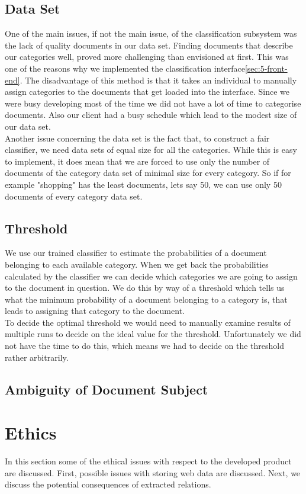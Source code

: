 \subsection{Data Set}
One of the main issues, if not the main issue, of the classification subsystem was the lack of quality documents in our data set. Finding documents that describe our categories well, proved more challenging than envisioned at first. This was one of the reasons why we implemented the classification interface\ref{sec:5-front-end}. The disadvantage of this method is that it takes an individual to manually assign categories to the documents that get loaded into the interface. Since we were busy developing most of the time we did not have a lot of time to categorise documents. Also our client had a busy schedule which lead to the modest size of our data set.\\
Another issue concerning the data set is the fact that, to construct a fair classifier, we need data sets of equal size for all the categories. While this is easy to implement, it does mean that we are forced to use only the number of documents of the category data set of minimal size for every category. So if for example "shopping" has the least documents, lets say 50, we can use only 50 documents of every category data set.

\subsection{Threshold}
We use our trained classifier to estimate the probabilities of a document belonging to each available category. When we get back the probabilities calculated by the classifier we can decide which categories we are going to assign to the document in question. We do this by way of a threshold which tells us what the minimum probability of a document belonging to a category is, that leads to assigning that category to the document.\\
To decide the optimal threshold we would need to manually examine results of multiple runs to decide on the ideal value for the threshold. Unfortunately we did not have the time to do this, which means we had to decide on the threshold rather arbitrarily.

\subsection{Ambiguity of Document Subject}


\section{Ethics}
In this section some of the ethical issues with respect to the developed product are discussed. First, possible issues with storing web data are discussed. Next, we discuss the potential consequences of extracted relations.

